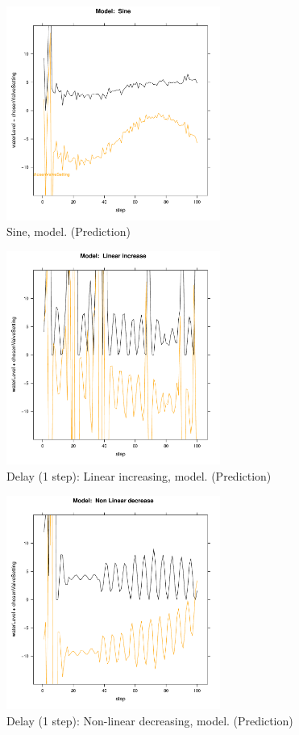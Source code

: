 \documentclass[twocolumn]{article}
\begin{document}
\begin{figure}[p]
\includegraphics[width=7cm]{sine_model.pdf}
\caption{Sine, model. (Prediction)}
\label{si2.model}
\end{figure}
\begin{figure}[p]
\includegraphics[width=7cm]{li_model_delay.pdf}
\caption{Delay (1 step): Linear increasing, model. (Prediction)}
\label{delay.li.model}
\end{figure}
\begin{figure}[p]
\includegraphics[width=7cm]{nd_model_delay.pdf}
\caption{Delay (1 step): Non-linear decreasing, model. (Prediction)}
\label{delay.nd.model}
\end{figure}
\end{document}
